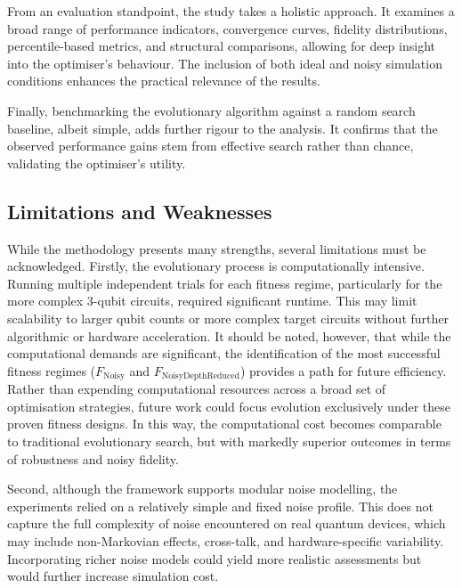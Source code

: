 \documentclass[11pt,a4paper]{article}
\begin{document}
From an evaluation standpoint, the study takes a holistic approach. It examines a broad range of performance indicators, convergence curves, fidelity distributions, percentile-based metrics, and structural comparisons, allowing for deep insight into the optimiser’s behaviour. The inclusion of both ideal and noisy simulation conditions enhances the practical relevance of the results.\newline

Finally, benchmarking the evolutionary algorithm against a random search baseline, albeit simple, adds further rigour to the analysis. It confirms that the observed performance gains stem from effective search rather than chance, validating the optimiser’s utility.

\subsection{Limitations and Weaknesses}\label{sec:limitations}
While the methodology presents many strengths, several limitations must be acknowledged. Firstly, the evolutionary process is computationally intensive. Running multiple independent trials for each fitness regime, particularly for the more complex 3-qubit circuits, required significant runtime. This may limit scalability to larger qubit counts or more complex target circuits without further algorithmic or hardware acceleration. It should be noted, however, that while the computational demands are significant, the identification of the most successful fitness regimes ($F_{\mathrm{Noisy}}$ and $F_{\mathrm{NoisyDepthReduced}}$) provides a path for future efficiency. Rather than expending computational resources across a broad set of optimisation strategies, future work could focus evolution exclusively under these proven fitness designs. In this way, the computational cost becomes comparable to traditional evolutionary search, but with markedly superior outcomes in terms of robustness and noisy fidelity.
\newline

Second, although the framework supports modular noise modelling, the experiments relied on a relatively simple and fixed noise profile. This does not capture the full complexity of noise encountered on real quantum devices, which may include non-Markovian effects, cross-talk, and hardware-specific variability. Incorporating richer noise models could yield more realistic assessments but would further increase simulation cost.\newline
\end{document}
